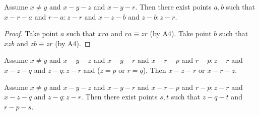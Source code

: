 \documentclass[10pt,a4paper,parskip=half,numbers=endperiod,headings=standardclasses,parskip]{scrbook}
\newcommand{\Cong}[4]{#1 #2 \equiv #3 #4}
\newcommand{\Betw}[3]{#1 #2 #3}
\newcommand{\fresha}{a}
\newcommand{\freshb}{b}
\newcommand{\OFS}[8]{\operatorname{OFS}
\left(\begin{smallmatrix}%
#1 & #2 & #3 & #4 \\
#5 & #6 & #7 & #8
\end{smallmatrix}\right)%
}
\begin{document}
  \begin{forthel}
    \begin{lemma} %
      Assume $x \neq y$ and $x-y-z$ and $x-y-r$.
      Then there exist points $\fresha,\freshb$ such that $x-r-\fresha$ and $r-\fresha : z-r$ and $x-z-\freshb$ and $z-\freshb : z-r$.
    \end{lemma}
    \begin{proof}
      Take point $a$ such that $\Betw{x}{r}{a}$ and $\Cong{r}{a}{z}{r}$ (by A4).
      Take point $b$ such that $\Betw{x}{z}{b}$ and $\Cong{z}{b}{z}{r}$ (by A4).
    \end{proof}



    \begin{lemma} %
      Assume $x \neq y$ and $x-y-z$ and $x-y-r$ and $x-r-p$ and $r-p : z-r$ and $x-z-q$ and $z-q : z-r$ and ($z = p$ or $r = q$). Then $x-z-r$ or $x-r-z$.
    \end{lemma}

    \begin{lemma} %
      Assume $x \neq y$ and $x-y-z$ and $x-y-r$ and $x-r-p$ and $r-p : z-r$ and $x-z-q$ and $z-q : z-r$. Then there exist points $s,t$ such that $z-q-t$ and $r-p-s$.
    \end{lemma}



  \end{forthel}
\end{document}
